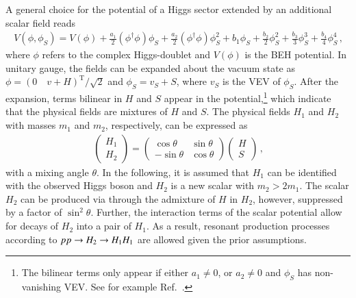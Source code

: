 \begin{description}
  A general choice for the potential of a Higgs sector extended by an additional
  scalar field
  reads~\cite{OConnell:2006rsp,No:2013wsa,Chen:2014ask,DiMicco:2019ngk}
  \begin{align*}
    V(\phi, \phi_{S}) = V(\phi)
    + \frac{a_1}{2} (\phi^\dagger \phi) \phi_{S}
    + \frac{a_2}{2} (\phi^\dagger \phi) \phi_{S}^2
    + b_1 \phi_{S} + \frac{b_2}{2} \phi_{S}^2 + \frac{b_3}{3} \phi_{S}^3 + \frac{b_4}{4} \phi_{S}^4 \,\text{,}
  \end{align*}
  where $\phi$ refers to the complex Higgs-doublet and $V(\phi)$ is the BEH
  potential. In unitary gauge, the fields can be expanded about the vacuum state
  as $\phi = (0 \quad v + H)^{\text{T}} / \sqrt{2}$ and $\phi_{S} = v_{S} + S$,
  where $v_{S}$ is the VEV of $\phi_{S}$. After the expansion, terms bilinear in
  $H$ and $S$ appear in the potential,\footnote{The bilinear terms only appear
    if either $a_1 \neq 0$, or $a_2 \neq 0$ and $\phi_{S}$ has non-vanishing
    VEV. See for example Ref.~\cite{Chen:2014ask}.} which indicate that the
  physical fields are mixtures of $H$ and $S$. The physical fields $H_1$ and
  $H_2$ with masses $m_1$ and $m_2$, respectively, can be expressed as
  \begin{align*}
    \begin{pmatrix}
      H_1 \\
      H_2
    \end{pmatrix}
    =
    \begin{pmatrix}
      \cos\theta & \sin\theta \\
      -\sin\theta & \cos\theta
    \end{pmatrix}
    \begin{pmatrix}
      H \\
      S
    \end{pmatrix} \,\text{,}
  \end{align*}
  with a mixing angle $\theta$. In the following, it is assumed that $H_1$ can
  be identified with the observed Higgs boson and $H_2$ is a new scalar with
  $m_2 > 2 m_1$.  The scalar $H_2$ can be produced via \ggF through the
  admixture of $H$ in $H_2$, however, suppressed by a factor of
  $\sin^2\theta$. Further, the interaction terms of the scalar potential allow
  for decays of $H_2$ into a pair of $H_1$. As a result, resonant production
  processes according to $pp \to H_2 \to H_1 H_1$ are allowed given the prior
  assumptions.


\end{description}
